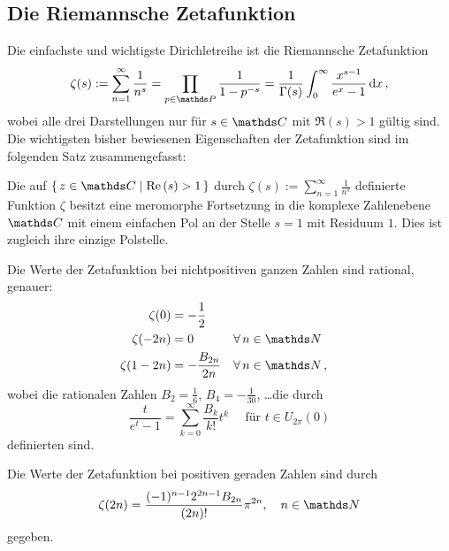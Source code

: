 \subsection{Die Riemannsche Zetafunktion}

Die einfachste und wichtigste Dirichletreihe ist die Riemannsche Zetafunktion
\[
	\zeta(s) 
	:= \sum_{n=1}^\infty \frac 1{n^s}
	= \prod_{p \in \PP} \frac 1{1 - p^{-s}}
	= \frac 1{\Gamma(s)} \int_0^\infty \frac {x^{s-1}}{e^x - 1} \opd x
	\,,
\]
wobei alle drei Darstellungen nur für $s \in \CC$ mit $\Re(s) > 1$ gültig sind. Die wichtigsten bisher bewiesenen Eigenschaften der Zetafunktion sind im folgenden Satz zusammengefasst:

\begin{satz}\label{Zeta-Fakten}
Die auf $\Set {z \in \CC \mid \Re(s) > 1}$ durch $\zeta(s) := \sum_{n=1}^\infty \frac 1{n^s}$ definierte Funktion $\zeta$ besitzt eine meromorphe Fortsetzung in die komplexe Zahlenebene $\CC$ mit einem einfachen Pol an der Stelle $s = 1$ mit Residuum $1$. Dies ist zugleich ihre einzige Polstelle. 

Die Werte der Zetafunktion bei nichtpositiven ganzen Zahlen sind rational, genauer:
\begin{align*}
	\zeta(0) &= - \frac 12 \\
	\zeta(-2n) &= 0 && \forall \, n \in \NN \\
	\zeta(1-2n) &= - \frac {B_{2n}}{2n} && \forall \, n \in \NN
	\,,
\end{align*}
wobei die rationalen Zahlen $B_2 = \frac 16$, $B_4 = - \frac 1{30}$, \ldots die durch
\[
	\frac t{e^t - 1} = \sum_{k=0}^\infty \frac {B_k}{k!} t^k \quad \text{ für } t \in U_{2\pi}(0)
\]
definierten  sind. 

Die Werte der Zetafunktion bei positiven geraden Zahlen sind durch
\[
	\zeta(2n) = \frac {(-1)^{n-1} 2^{2n-1} B_{2n}}{(2n)!} \pi^{2n}, \quad n \in \NN
\]
gegeben.
\end{satz}


